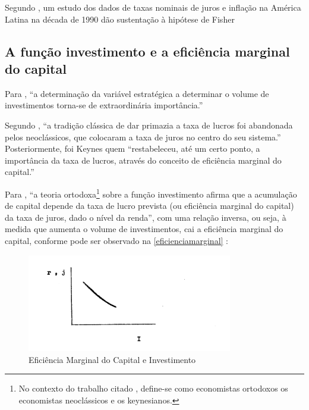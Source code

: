 \documentclass[
	10pt,				%
	openright,			%
	twoside,			%
	a5paper,			%
	english,			%
	french,				%
	spanish,			%
	brazil				%
	]{abntex2}
\begin{document}
Segundo , um estudo dos dados de taxas
nominais de juros e inflação na América Latina na década de 1990 dão
sustentação à hipótese de Fisher

\subsection{A função investimento e a eficiência marginal do
capital}\label{a-funuxe7uxe3o-investimento-e-a-eficiuxeancia-marginal-do-capital}

Para , ``a determinação da
variável estratégica a determinar o volume de investimentos torna-se de
extraordinária importância.''

Segundo , ``a tradição clássica de
dar primazia a taxa de lucros foi abandonada pelos neoclássicos, que
colocaram a taxa de juros no centro do seu sistema.'' Posteriormente,
foi Keynes quem ``restabeleceu, até um certo ponto, a importância da
taxa de lucros, através do conceito de eficiência marginal do capital.''

Para , ``a teoria
ortodoxa\footnote{No contexto do trabalho citado
  \cite[p.~3]{Bresser-Pereira1973}, define-se como economistas ortodoxos
  os economistas neoclássicos e os keynesianos.} sobre a função
investimento afirma que a acumulação de capital depende da taxa de lucro
prevista (ou eficiência marginal do capital) da taxa de juros, dado o
nível da renda'', com uma relação inversa, ou seja, à medida que aumenta
o volume de investimentos, cai a eficiência marginal do capital,
conforme pode ser observado na \autoref{eficienciamarginal}
\cite[p.~4]{Bresser-Pereira1973}:

\begin{figure}[htbp]
\caption{Eficiência Marginal do Capital e Investimento}\label{eficienciamarginal}
\begin{center}
\includegraphics[width=0.80000\textwidth]{imagens/Page-4-Image-1.png}
\end{center}
\end{figure}
\end{document}
